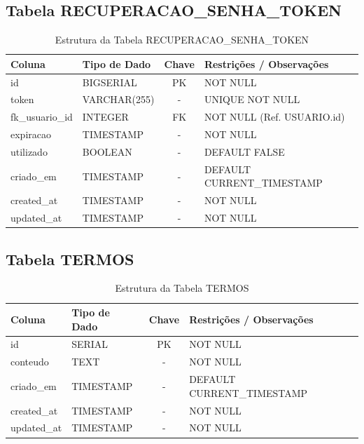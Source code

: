 \documentclass[
	12pt,				%
	openany,			%
	oneside,			%
	a4paper,			%
	english,			%
	french,				%
	spanish,			%
	brazil				%
	]{abntex2}
\begin{document}
\begin{apendicesenv}
\subsection{Tabela RECUPERACAO\_SENHA\_TOKEN}
\begin{table}[H]
\centering
\caption{Estrutura da Tabela RECUPERACAO\_SENHA\_TOKEN}
\begin{tabular}{|l|p{4cm}|c|p{6cm}|}
\hline
\textbf{Coluna} & \textbf{Tipo de Dado} & \textbf{Chave} & \textbf{Restrições / Observações} \\ \hline
id & BIGSERIAL & PK & NOT NULL \\ \hline
token & VARCHAR(255) & - & UNIQUE NOT NULL \\ \hline
fk\_usuario\_id & INTEGER & FK & NOT NULL (Ref. USUARIO.id) \\ \hline
expiracao & TIMESTAMP & - & NOT NULL \\ \hline
utilizado & BOOLEAN & - & DEFAULT FALSE \\ \hline
criado\_em & TIMESTAMP & - & DEFAULT CURRENT\_TIMESTAMP \\ \hline
created\_at & TIMESTAMP & - & NOT NULL \\ \hline
updated\_at & TIMESTAMP & - & NOT NULL \\ \hline
\end{tabular}
\end{table}

\subsection{Tabela TERMOS}
\begin{table}[H]
\centering
\caption{Estrutura da Tabela TERMOS}
\begin{tabular}{|l|p{4cm}|c|p{6cm}|}
\hline
\textbf{Coluna} & \textbf{Tipo de Dado} & \textbf{Chave} & \textbf{Restrições / Observações} \\ \hline
id & SERIAL & PK & NOT NULL \\ \hline
conteudo & TEXT & - & NOT NULL \\ \hline
criado\_em & TIMESTAMP & - & DEFAULT CURRENT\_TIMESTAMP \\ \hline
created\_at & TIMESTAMP & - & NOT NULL \\ \hline
updated\_at & TIMESTAMP & - & NOT NULL \\ \hline
\end{tabular}
\end{table}


\end{apendicesenv}
\end{document}
